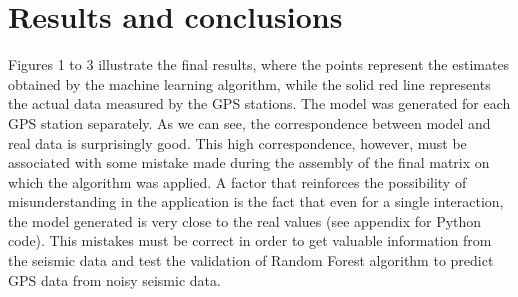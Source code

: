 \documentclass{article}
\begin{document}

\vspace*{0.5cm}

\section{Results and conclusions}

Figures 1 to 3 illustrate the final results, where the points represent the estimates obtained by the machine learning algorithm, while the solid red line represents the actual data measured by the GPS stations. The model was generated for each GPS station separately. As we can see, the correspondence between model and real data is surprisingly good. This high correspondence, however, must be associated with some mistake made during the assembly of the final matrix on which the algorithm was applied. A factor that reinforces the possibility of misunderstanding in the application is the fact that even for a single interaction, the model generated is very close to the real values (see appendix for Python code). This mistakes must be correct in order to get valuable information from the seismic data and test the validation of Random Forest algorithm to predict GPS data from noisy seismic data.

\end{document}
